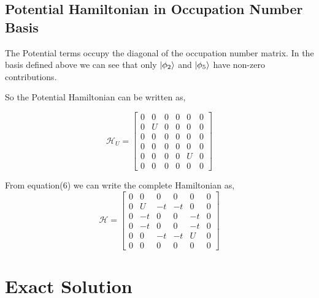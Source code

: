 \documentclass{article}
\begin{document}
\subsection{Potential Hamiltonian in Occupation Number Basis}
The Potential terms occupy the diagonal of the occupation number matrix. In the basis defined above we can see that
only \(\ket{\phi_2} \) and \(\ket{\phi_5}\) have non-zero contributions.

So the Potential Hamiltonian can be written as,

\begin{equation}
  \mathcal{H}_U =
  \begin{bmatrix}
    0 & 0 & 0 & 0 & 0 & 0 \\
    0 & U & 0 & 0 & 0 & 0 \\
    0 & 0 & 0 & 0 & 0 & 0 \\
    0 & 0 & 0 & 0 & 0 & 0 \\
    0 & 0 & 0 & 0 & U & 0 \\
    0 & 0 & 0 & 0 & 0 & 0
  \end{bmatrix}
\end{equation}

From equation(6) we can write the complete Hamiltonian as,
\begin{equation}
  \mathcal{H} =
  \begin{bmatrix}
    0 & 0 & 0 & 0 & 0 & 0   \\
    0 & U & -t & -t & 0 & 0 \\
    0 & -t & 0 & 0 & -t & 0 \\
    0 & -t & 0 & 0 & -t & 0 \\
    0 & 0 & -t & -t & U & 0 \\
    0 & 0 & 0 & 0 & 0 & 0
  \end{bmatrix}
\end{equation}
\section{Exact Solution}
\end{document}
